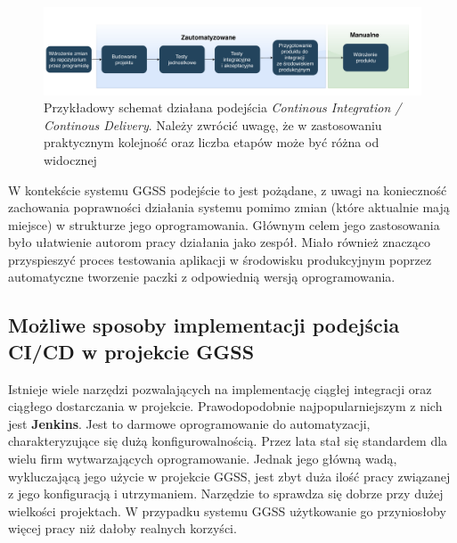 \begin{figure}[H]
\centering
\caption{Przykładowy schemat działana podejścia \textit{Continous Integration / Continous Delivery}. Należy zwrócić uwagę, że w zastosowaniu praktycznym kolejność oraz liczba etapów może być różna od widocznej}
\label{fig:cicd}
\includegraphics[width=\textwidth]{res/CICD.pdf}
\end{figure}

W kontekście systemu GGSS podejście to jest pożądane, z uwagi na konieczność zachowania poprawności działania systemu pomimo zmian (które aktualnie mają miejsce) w strukturze jego oprogramowania. Głównym celem jego zastosowania było ułatwienie autorom pracy działania jako zespół. Miało również znacząco przyspieszyć proces testowania aplikacji w środowisku produkcyjnym poprzez automatyczne tworzenie paczki z odpowiednią wersją oprogramowania.

\subsection{Możliwe sposoby implementacji podejścia CI/CD w projekcie GGSS}
Istnieje wiele narzędzi pozwalających na implementację ciągłej integracji oraz ciągłego dostarczania w projekcie. Prawodopodobnie najpopularniejszym z nich jest \textbf{Jenkins}. Jest to darmowe \cite{JenkinsWiki} oprogramowanie do automatyzacji, charakteryzujące się dużą konfigurowalnością. Przez lata stał się standardem dla wielu firm wytwarzających oprogramowanie. Jednak jego główną wadą, wykluczającą jego użycie w projekcie GGSS, jest zbyt duża ilość pracy związanej z jego konfiguracją i utrzymaniem. Narzędzie to sprawdza się dobrze przy dużej wielkości projektach. W przypadku systemu GGSS użytkowanie go przyniosłoby więcej pracy niż dałoby realnych korzyści. 

